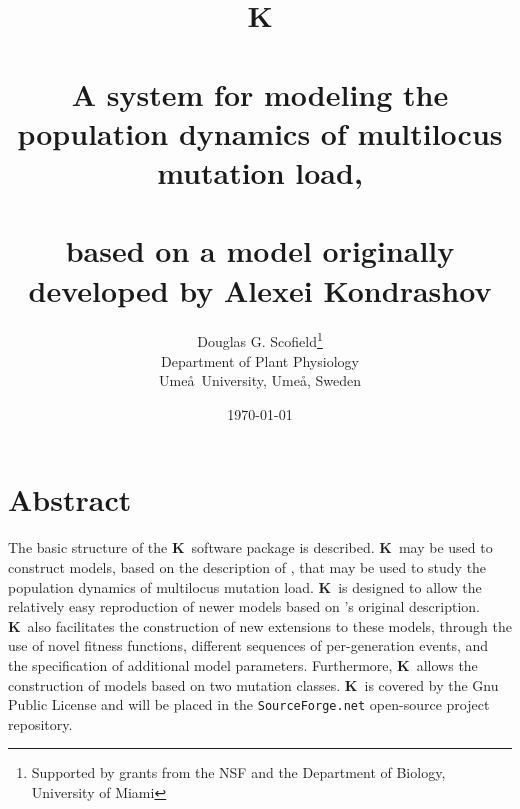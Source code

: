 \documentclass[12pt,twoside,letterpaper,fleqn]{report}
\numberwithin{equation}{section}  %
\newcommand{\K}{{\bf K}}
\begin{document}
\title{\K \\ \  \\ A system for modeling the population dynamics of multilocus mutation load, \\ \  \\ based on a model originally developed by Alexei Kondrashov}
\author{Douglas G. Scofield\thanks{Supported by grants from the NSF and the Department of Biology, University of Miami} \\ Department of Plant Physiology \\ Ume\aa\ University, Ume\aa, Sweden}
\date{\today}
\maketitle

\chapter*{Abstract}

The basic structure of the \K\ software package is described.  \K\ may be used
to construct models, based on the description of \citet{Kondrashov:1985:5375},
that may be used to study the population dynamics of multilocus mutation load.
\K\ is designed to allow the relatively easy reproduction of newer models based
on \citeauthor{Kondrashov:1985:5375}'s original description.  \K\ also
facilitates the construction of new extensions to these models, through the use
of novel fitness functions, different sequences of per-generation events, and
the specification of additional model parameters.  Furthermore, \K\ allows the
construction of models based on two mutation classes.  \K\ is covered by the
Gnu Public License and will be placed in the {\tt SourceForge.net} open-source
project repository.

\clearpage

\singlespacing
\tableofcontents
\listoftables
\listoffigures
\doublespacing
\clearpage
\end{document}
